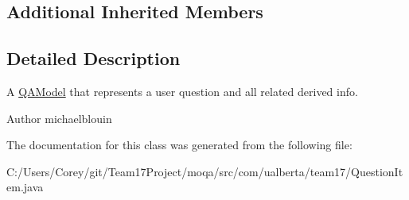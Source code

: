 \subsection*{Additional Inherited Members}


\subsection{Detailed Description}
A \hyperlink{classcom_1_1ualberta_1_1team17_1_1_q_a_model}{Q\+A\+Model} that represents a user question and all related derived info.

\begin{DoxyAuthor}{Author}
michaelblouin 
\end{DoxyAuthor}


The documentation for this class was generated from the following file\+:\begin{DoxyCompactItemize}
\item 
C\+:/\+Users/\+Corey/git/\+Team17\+Project/moqa/src/com/ualberta/team17/Question\+Item.\+java\end{DoxyCompactItemize}
